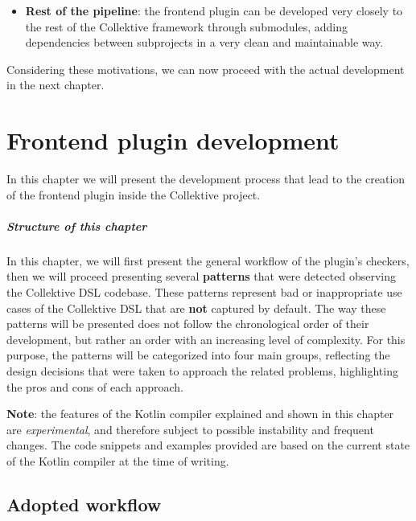 \documentclass[12pt,a4paper,openright,twoside]{book}
\begin{document}
\begin{enumerate}
\begin{itemize}
    \item \textbf{Rest of the pipeline}: the frontend plugin can be developed 
    very closely to the rest of the Collektive framework through submodules,
    adding dependencies between subprojects in a very clean and maintainable
    way.
  \end{itemize}
\end{enumerate}

Considering these motivations, we can now proceed with the actual development in
the next chapter.

\chapter{Frontend plugin development}
\label{chap:contribution}

In this chapter we will present the development process that lead to the creation of 
the frontend plugin inside the Collektive project.

\paragraph{Structure of this chapter}

In this chapter, we will first present the general workflow of the plugin's
checkers, then we will proceed presenting several \textbf{patterns} that were
detected observing the Collektive DSL codebase. These patterns represent bad or
inappropriate use cases of the Collektive DSL that are \textbf{not} captured by 
default. 
%
The way these patterns will be presented does not follow the chronological order 
of their development, but rather an order with an increasing level of complexity.
For this purpose, the patterns will be categorized into four main groups, 
reflecting the design decisions that were taken to approach the related problems,
highlighting the pros and cons of each approach. 

\textbf{Note}: the features of the Kotlin compiler explained and shown in
this chapter are \emph{experimental}, and therefore subject to possible instability
and frequent changes. The code snippets and examples provided are based on the
current state of the Kotlin compiler at the time of writing. 

\section{Adopted workflow}
\end{document}
